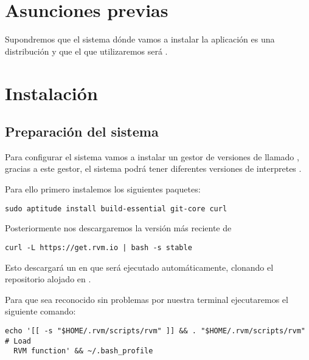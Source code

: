 

\section{Asunciones previas}
Supondremos que el sistema dónde vamos a instalar la aplicación es una
distribución  y que el  que utilizaremos
será .

\section{Instalación}
\subsection{Preparación del sistema}
Para configurar el sistema vamos a instalar un gestor de versiones de
 llamado  \cite{prog:rvm}, gracias a este gestor, el
sistema podrá tener diferentes versiones de interpretes .

Para ello primero instalemos los siguientes paquetes:

\begin{lstlisting}[style=consola]
  sudo aptitude install build-essential git-core curl
\end{lstlisting}

Posteriormente nos descargaremos la versión más reciente de 

\begin{lstlisting}[style=consola]
  curl -L https://get.rvm.io | bash -s stable
\end{lstlisting}

Esto descargará un  en  que será ejecutado
automáticamente, clonando el repositorio alojado en .

Para que  sea reconocido sin problemas por nuestra terminal
ejecutaremos el siguiente comando:

\begin{lstlisting}[style=consola]
  echo '[[ -s "$HOME/.rvm/scripts/rvm" ]] && . "$HOME/.rvm/scripts/rvm" # Load
  RVM function' && ~/.bash_profile
\end{lstlisting}

